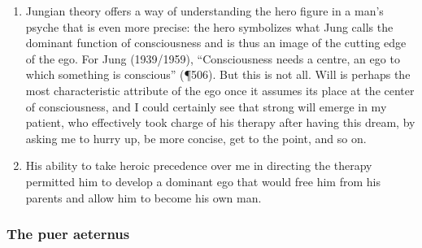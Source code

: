 \begin{enumerate}
    \item {} Jungian theory offers a way of
        understanding the hero figure in a man’s psyche that is even more
        precise: the hero symbolizes what Jung calls the dominant function of
        consciousness and is thus an image of the cutting edge of the ego. For
        Jung (1939/1959), “Consciousness needs a centre, an ego to which
        something is conscious” (¶506). But this is not all. Will is perhaps
        the most characteristic attribute of the ego once it assumes its place
        at the center of consciousness, and I could certainly see that strong
        will emerge in my patient, who effectively took charge of his therapy
        after having this dream, by asking me to hurry up, be more concise, get
        to the point, and so on.

    \item {} His ability to take heroic
        precedence over me in directing the therapy permitted him to develop a
        dominant ego that would free him from his parents and allow him to
        become his own man.

\end{enumerate}

\subsubsection{The puer aeternus}


